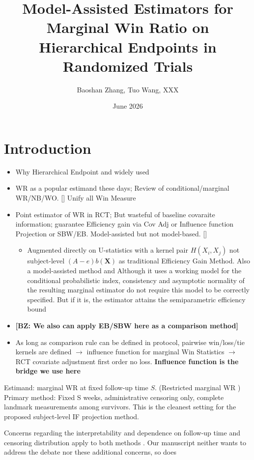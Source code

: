 \documentclass[11pt,a4paper]{article}
\title{Model-Assisted Estimators for Marginal Win Ratio on Hierarchical Endpoints in Randomized Trials}
\author{Baoshan Zhang, Tuo Wang, XXX}
\date{June 2026}
\begin{document}
\maketitle

\section{Introduction}
\begin{itemize}
    \item Why Hierarchical Endpoint and widely used 
    \item WR as a popular estimand these days; Review of conditional/marginal WR/NB/WO. [\cite{mao2021class}] Unify all Win Measure
    \item Point estimator of WR in RCT; But wasteful of baseline covaraite information; guarantee Efficiency gain via Cov Adj or Influence function Projection or SBW/EB. Model-assisted but not model-based. [\cite{zhang2025unified}]
    \begin{itemize}
        \item \citep{vermeulen2015increasing, scheidegger2026covariate} Augmented directly on U-statistics with a kernel pair $H(X_i, X_j)$ not subject-level $(A-e)b(\mathbf{X})$ as traditional Efficiency Gain Method. Also a model-assisted method and Although it uses a working model for the conditional probabilistic index, consistency and asymptotic normality of the resulting marginal estimator do not require this model to be correctly specified. But if it is, the estimator attains the semiparametric efficiency bound
    \end{itemize}
    \item \textbf{[BZ: We also can apply EB/SBW here as a comparison method]}
    \item As long as comparison rule can be defined in protocol, pairwise win/loss/tie kernels are defined $\rightarrow$ influence function for marginal Win Statistics $\rightarrow$ RCT covariate adjustment first order no loss. \textbf{Influence function is the bridge we use here}
\end{itemize}

Estimand: marginal WR at fixed follow-up time $S$. (Restricted marginal WR \citep{mao2024defining})
Primary method:
Fixed S weeks, administrative censoring only, complete landmark measurements among survivors. This is the cleanest setting for the proposed subject-level IF projection method.

Concerns regarding the interpretability and dependence on follow-up time and censoring distribution apply to both methods \citep{oakes2016win, dong2020win}. Our manuscript neither wants to address the debate nor these additional concerns, so does \citep{scheidegger2026covariate}
\end{document}
